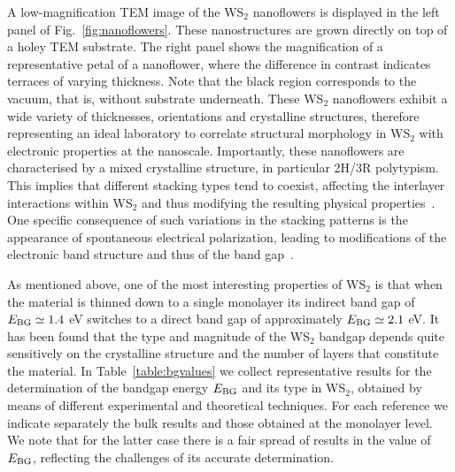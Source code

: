 A low-magnification TEM image of the WS$_2$ nanoflowers is displayed
in the left panel of Fig.~\ref{fig:nanoflowers}.
%
These nanostructures are grown directly on top of a holey TEM substrate.
%
The right panel shows the magnification of a
representative petal
of a nanoflower, where
the difference in contrast indicates terraces of varying thickness.
%
Note that the black region corresponds to the vacuum, that is, without
substrate underneath.
%
These WS$_2$ nanoflowers exhibit a wide variety of thicknesses, orientations
and crystalline structures, therefore representing an ideal laboratory to correlate
structural morphology in WS$_2$ with electronic properties at the nanoscale.
%
Importantly, these nanoflowers are characterised by a mixed crystalline structure,
in particular 2H/3R polytypism.
%
This implies that different stacking types tend to coexist,  affecting
the interlayer interactions within WS$_2$
and thus modifying the resulting physical properties~\cite{Na:2018}.
%
One specific consequence of such variations in the stacking patterns is the appearance of
spontaneous electrical polarization, leading to modifications of the 
electronic band structure and thus of the band gap~\cite{Lee:2016}.



As mentioned above, one of the most interesting properties of  WS$_2$ is
that when the material
is thinned down to a single monolayer its indirect band gap of
$E_{\rm BG}\simeq 1.4$ eV
switches to a direct band gap of approximately $E_{\rm BG}\simeq 2.1$ eV.
%
It has been found that the type and magnitude of the  WS$_2$  bandgap
depends quite sensitively on the crystalline structure and
the number of layers that constitute the material.
%
In Table~\ref{table:bgvalues} we collect
representative results for the determination of the bandgap energy $E_{\rm BG}$
and its type in WS$_2$, obtained by means of different experimental and theoretical techniques.
%
 For each reference we indicate separately the bulk results and those
obtained at the monolayer level.
%
We note that for the latter case there is a fair spread of results in the
value of $E_{\rm BG}$, reflecting the challenges of its accurate determination.

